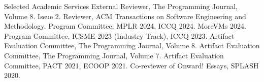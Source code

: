 \begin{rubric}{Selected Academic Services}
  \entry*[2024] External Reviewer, The Programming Journal, Volume 8. Issue 2.
  \entry*[2024] Reviewer, ACM Transactions on Software Engineering and Methodology.
  \entry*[2024] Program Committee, MPLR 2024, ICCQ 2024. MoreVMs 2024.
  \entry*[2023] Program Committee, ICSME 2023 (Industry Track), ICCQ 2023.
  \entry*[2023] Artifact Evaluation Committee, The Programming Journal, Volume 8.
  \entry*[2022] Artifact Evaluation Committee, The Programming Journal, Volume 7.
  \entry*[2021] Artifact Evaluation Committee, PACT 2021, ECOOP 2021.
  \entry*[2020] Co-reviewer of Onward! Essays, SPLASH 2020.
\end{rubric}
